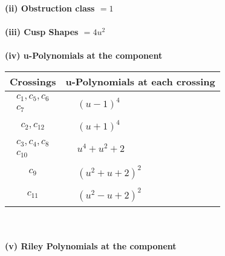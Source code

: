 \documentclass[1p]{elsarticle_modified}
\theoremstyle{definition}
\begin{document}
\flushleft \textbf{(ii) Obstruction class $= 1$}\\~\\
\flushleft \textbf{(iii) Cusp Shapes $= 4 u^2$}\\~\\
\newpage\renewcommand{\arraystretch}{1}
\flushleft \textbf{(iv) u-Polynomials at the component}\newline \\
\begin{tabular}{m{50pt}|m{274pt}}
Crossings & \hspace{64pt}u-Polynomials at each crossing \\
\hline $$\begin{aligned}c_{1},c_{5},c_{6}\\c_{7}\end{aligned}$$&$\begin{aligned}
&(u-1)^4
\end{aligned}$\\
\hline $$\begin{aligned}c_{2},c_{12}\end{aligned}$$&$\begin{aligned}
&(u+1)^4
\end{aligned}$\\
\hline $$\begin{aligned}c_{3},c_{4},c_{8}\\c_{10}\end{aligned}$$&$\begin{aligned}
&u^4+u^2+2
\end{aligned}$\\
\hline $$\begin{aligned}c_{9}\end{aligned}$$&$\begin{aligned}
&(u^2+u+2)^2
\end{aligned}$\\
\hline $$\begin{aligned}c_{11}\end{aligned}$$&$\begin{aligned}
&(u^2- u+2)^2
\end{aligned}$\\
\hline
\end{tabular}\\~\\
\newpage\renewcommand{\arraystretch}{1}
\flushleft \textbf{(v) Riley Polynomials at the component}\newline \\
\end{document}
